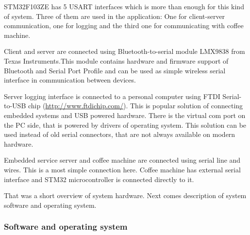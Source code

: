 STM32F103ZE has 5 USART interfaces which is more than enough for this kind of
system. Three of them are used in the application: One for client-server
communication, one for logging and the third one for communicating with coffee
machine.

Client and server are connected using Bluetooth-to-serial module LMX9838 from
Texas Instruments.This module contains hardware and firmware support of
Bluetooth and Serial Port Profile and can be used as simple wireless serial
interface in communication between devices.

Server logging interface is connected to a personal computer using FTDI
Serial-to-USB chip (\url{http://www.ftdichip.com/}). This is popular solution of
connecting embedded systems and USB powered hardware. There is the virtual com
port on the PC side, that is powered by drivers of operating system. This
solution can be used instead of old serial connectors, that are not always
available on modern hardware.

Embedded service server and coffee machine are connected using serial line and
wires. This is a most simple connection here. Coffee machine has external serial
interface and STM32 microcontroller is connected directly to it.

That was a short overview of system hardware. Next comes description of system
software and operating system.

\subsubsection{Software and operating system}


